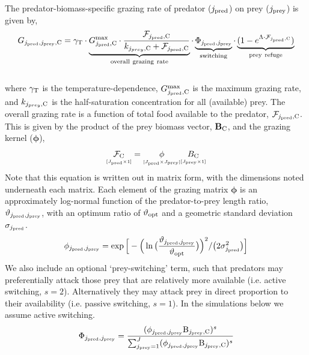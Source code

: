 \documentclass[gmd, manuscript]{copernicus}
\newcommand{\matr}[1]{\mathbf{#1}}
\newcommand{\sss}[1]{\scriptscriptstyle{#1}}
\begin{document}
The predator-biomass-specific grazing rate of predator ($j_{\rm pred}$) on prey ($j_{\rm prey}$) is given by,
%
\begin{equation}
G_{j_{\rm pred},j_{\rm prey},{\rm C}} = 
\gamma_{\rm T}
\cdot \underbrace{G_{j_{\rm pred},{\rm C}}^{\rm max} \cdot  \frac{\mathcal{F}_{j_{\rm pred},{\rm C}}}{k_{j_{prey},\rm C} + \mathcal{F}_{j_{\rm pred},{\rm C}} } }_{\rm overall~grazing~rate}
\cdot \underbrace{\Phi_{j_{\rm pred},j_{\rm prey}}}_{\rm switching}
\cdot \underbrace{(1-e^{\Lambda \cdot \mathcal{F}_{j_{\rm pred},{\rm C}}}) }_{\rm prey~refuge}
\label{grazing_func}
\end{equation}
\\
where $\gamma_{\rm T}$ is the temperature-dependence, $G_{j_{\rm pred},{\rm C}}^{\rm max}$ is the maximum grazing rate, and $k_{j_{prey},\rm C}$ is the half-saturation concentration for all (available) prey. The overall grazing rate is a function of total food available to the predator, $\mathcal{F}_{j_{\rm pred},{\rm C}}$. This is given by the product of the prey biomass vector, $\matr{B}_{\rm C}$, and the grazing kernel ($\boldsymbol{\phi}$),
%
\begin{equation}
\underset{\sss [J_{\rm pred}\times 1]}{\boldsymbol{\mathcal{F}}_{\rm C}} = \underset{\sss [J_{\rm pred}\times J_{\rm prey}]}{\boldsymbol{\phi}} \underset{\sss [J_{\rm prey}\times 1]}{\boldsymbol{B}_{\rm C}}
\end{equation}
%
Note that this equation is written out in matrix form, with the dimensions noted underneath each matrix. Each element of the grazing matrix $\boldsymbol{\phi}$ is an approximately log-normal function of the predator-to-prey length ratio, $\vartheta_{j_{\rm pred},j_{\rm prey}}$, with an optimum ratio of $\vartheta_{\rm opt}$ and a geometric standard deviation $\sigma_{j_{\rm pred}}$. 
%
\begin{equation}
\phi_{j_{\rm pred},j_{\rm prey}} = \exp\Big[-\Big(\ln\big(\frac{\vartheta_{j_{\rm pred},j_{\rm prey}}}{\vartheta_{\rm opt}}\big)\Big)^2 /\big(2\sigma_{j_{\rm pred}}^2\big) \Big]
\end{equation}
%
We also include an optional `prey-switching' term, such that predators may preferentially attack those prey that are relatively more available (i.e. active switching, $s=2$). Alternatively they may attack prey in direct proportion to their availability (i.e. passive switching, $s=1$). In the simulations below we assume active switching.
%
\begin{equation}
\Phi_{j_{\rm pred},j_{\rm prey}} = \frac{(\phi_{j_{\rm pred},j_{\rm prey}} {\rm B}_{j_{\rm prey},{\rm C}})^{s}}{\sum_{j_{\rm prey}=1}^J (\phi_{j_{\rm pred},j_{\rm prey}} {\rm B}_{j_{\rm prey},{\rm C}})^{s}}
\label{switching}
\end{equation}
\end{document}
